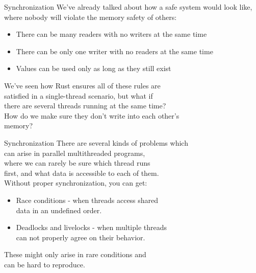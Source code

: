 \documentclass[usenames,dvipsnames,10pt,aspectratio=169]{beamer}
\begin{document}
\begin{frame}{Synchronization}
	\large
	We've already talked about how a safe system would look like,
	where nobody will violate the memory safety of others:
	\vspace{0.4cm}
	\begin{itemize}[label=$\bullet$]
		\item There can be many readers with no writers at the same time
		\item There can be only one writer with no readers at the same time
		\item Values can be used only as long as they still exist
	\end{itemize}
	\vspace{0.4cm}
	We've seen how Rust ensures all of these rules are\\
	satisfied in a single-thread scenario, but what if\\
	there are several threads running at the same time?\\
	How do we make sure they don't write into each other's\\
	memory?
\end{frame}

\begin{frame}{Synchronization}
	There are several kinds of problems which\\
	can arise in parallel multithreaded programs,\\
	where we can rarely be sure which thread runs\\
	first, and what data is accessible to each of them.\\
	\vspace{0.2cm}
	Without proper synchronization, you can get:\\
	\vspace{0.2cm}
	\begin{itemize}[label=$\bullet$]
		\item Race conditions - when threads access shared\\
			data in an undefined order.
		\item Deadlocks and livelocks - when multiple threads\\
			can not properly agree on their behavior.
	\end{itemize}
	\vspace{0.2cm}
	These might only arise in rare conditions and\\
	can be hard to reproduce.
\end{frame}
\end{document}

